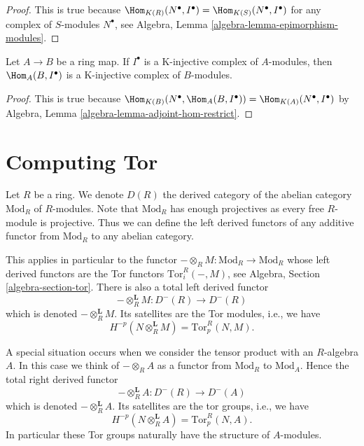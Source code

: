 \begin{proof}
This is true because
$\Hom_{K(R)}(N^\bullet, I^\bullet) =
\Hom_{K(S)}(N^\bullet, I^\bullet)$ for any complex of $S$-modules
$N^\bullet$,
see Algebra, Lemma \ref{algebra-lemma-epimorphism-modules}.
\end{proof}

\begin{lemma}
\label{lemma-hom-K-injective}
Let $A \to B$ be a ring map. If $I^\bullet$ is a K-injective complex of
$A$-modules, then $\Hom_A(B, I^\bullet)$ is a K-injective complex of
$B$-modules.
\end{lemma}

\begin{proof}
This is true because
$\Hom_{K(B)}(N^\bullet, \Hom_A(B, I^\bullet)) =
\Hom_{K(A)}(N^\bullet, I^\bullet)$
by Algebra, Lemma \ref{algebra-lemma-adjoint-hom-restrict}.
\end{proof}










\section{Computing Tor}
\label{section-computing-tor}

\noindent
Let $R$ be a ring. We denote $D(R)$ the derived category of the
abelian category $\text{Mod}_R$ of $R$-modules. Note that $\text{Mod}_R$
has enough projectives as every free $R$-module is projective.
Thus we can define the left derived functors of any additive functor
from $\text{Mod}_R$ to any abelian category.

\medskip\noindent
This applies in particular to the functor
$ - \otimes_R M : \text{Mod}_R \to \text{Mod}_R$
whose left derived functors are the Tor functors $\text{Tor}_i^R(-, M)$, see
Algebra, Section \ref{algebra-section-tor}.
There is also a total left derived functor
\begin{equation}
\label{equation-derived-tensor-module}
-\otimes_R^{\mathbf{L}} M :
D^{-}(R)
\longrightarrow
D^{-}(R)
\end{equation}
which is denoted $-\otimes_R^{\mathbf{L}} M$. Its satellites are the
Tor modules, i.e., we have
$$
H^{-p}(N \otimes_R^{\mathbf{L}} M) = \text{Tor}_p^R(N, M).
$$

\medskip\noindent
A special situation occurs when we consider the tensor product with
an $R$-algebra $A$. In this case we think of $- \otimes_R A$
as a functor from $\text{Mod}_R$ to $\text{Mod}_A$. Hence the total
right derived functor
\begin{equation}
\label{equation-derived-tensor-algebra}
-\otimes_R^{\mathbf{L}} A :
D^{-}(R)
\longrightarrow
D^{-}(A)
\end{equation}
which is denoted $-\otimes_R^{\mathbf{L}} A$. Its satellites are the
tor groups, i.e., we have
$$
H^{-p}(N \otimes_R^{\mathbf{L}} A) = \text{Tor}_p^R(N, A).
$$
In particular these Tor groups naturally have the structure of $A$-modules.

